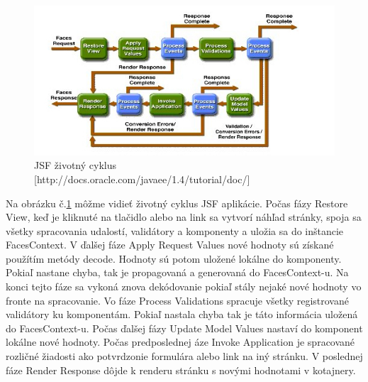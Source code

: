 \begin{figure}[htb]

\begin{center}

\includegraphics[scale=0.7]{jsflifecycle.jpg} 
\caption{JSF životný cyklus [http://docs.oracle.com/javaee/1.4/tutorial/doc/] }
\label{lifecycle}

\end{center}

\end{figure}
Na obrázku č.\ref{lifecycle} môžme vidieť životný cyklus JSF aplikácie. Počas fázy Restore View, keď je kliknuté na tlačidlo alebo na link sa vytvorí náhľad stránky, spoja sa všetky spracovania udalostí, validátory a komponenty a uložia sa do inštancie FacesContext. V ďalšej fáze Apply Request Values nové hodnoty sú získané použítím metódy decode. Hodnoty sú potom uložené lokálne do komponenty. Pokiaľ nastane chyba, tak je propagovaná a generovaná do FacesContext-u. Na konci tejto fáze sa vykoná znova dekódovanie pokiaľ stály nejaké nové hodnoty vo fronte na spracovanie. Vo fáze Process Validations spracuje všetky registrované validátory ku komponentám. Pokiaľ nastala chyba tak je táto informácia uložená do FacesContext-u. Počas ďalšej fázy Update Model Values nastaví do komponent lokálne nové hodnoty. Počas predposlednej áze Invoke Application je spracované rozličné žiadosti ako potvrdzonie formulára alebo link na iný stránku. V poslednej fáze Render Response dôjde k renderu stránku s novými hodnotami v kotajnery.
